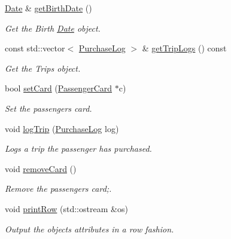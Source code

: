 \begin{DoxyCompactItemize}
\mbox{\hyperlink{classDate}{Date}} \& \mbox{\hyperlink{classPassenger_a23e16eaaf1c1927240380aa02e9d44a4}{get\+Birth\+Date}} ()
\begin{DoxyCompactList}\small\item\em Get the Birth \mbox{\hyperlink{classDate}{Date}} object. \end{DoxyCompactList}\item 
const std\+::vector$<$ \mbox{\hyperlink{classPurchaseLog}{Purchase\+Log}} $>$ \& \mbox{\hyperlink{classPassenger_a4d8911ca0e8fe1d9226594674bd04af4}{get\+Trip\+Logs}} () const
\begin{DoxyCompactList}\small\item\em Get the Trips object. \end{DoxyCompactList}\item 
bool \mbox{\hyperlink{classPassenger_a09fa79cfc599fa16f54fc34db0b56ea4}{set\+Card}} (\mbox{\hyperlink{classPassengerCard}{Passenger\+Card}} $\ast$c)
\begin{DoxyCompactList}\small\item\em Set the passenger\textquotesingle{}s card. \end{DoxyCompactList}\item 
void \mbox{\hyperlink{classPassenger_ad61aeee59fcdb0084a6cc12d16305d12}{log\+Trip}} (\mbox{\hyperlink{classPurchaseLog}{Purchase\+Log}} log)
\begin{DoxyCompactList}\small\item\em Logs a trip the passenger has purchased. \end{DoxyCompactList}\item 
\mbox{\label{classPassenger_a7afe05c6e57aa998954b878a5b632dac}} 
void \mbox{\hyperlink{classPassenger_a7afe05c6e57aa998954b878a5b632dac}{remove\+Card}} ()
\begin{DoxyCompactList}\small\item\em Remove the passenger\textquotesingle{}s card;. \end{DoxyCompactList}\item 
void \mbox{\hyperlink{classPassenger_a72e4042544557a3dd9c02198aa2582d8}{print\+Row}} (std\+::ostream \&os)
\begin{DoxyCompactList}\small\item\em Output the object\textquotesingle{}s attributes in a row fashion. \end{DoxyCompactList}\end{DoxyCompactItemize}
